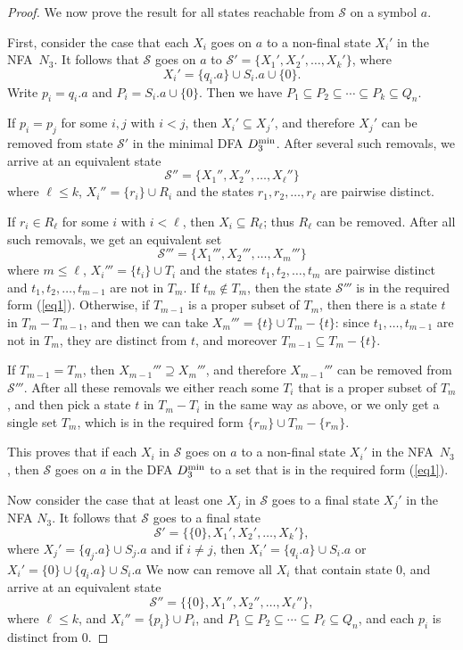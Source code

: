 \documentclass[runningheads]{llncs}
\begin{document}
\begin{proof}
\bigskip
 We now prove the result for all states reachable from $\mathcal{S}$
 on a symbol $a$.

 First, consider the case that each $X_i$ goes on $a$
 to a non-final state $X_i'$ in the NFA~$N_3$.
 It follows that $\mathcal{S}$ goes on $a$
 to $\mathcal{S'}=\{X_1',X_2',\ldots,X_k'\}$,
 where
 $$
    X_i'= \{q_i.a\} \cup S_i.a \cup \{0\}.
 $$
 Write $p_i=q_i.a$ and $P_i=S_i.a\cup\{0\}$.
 Then we have $P_1\subseteq P_2\subseteq \cdots  \subseteq P_k\subseteq Q_n$.

 If $p_i=p_j$ for some $i,j$ with $i<j$,
 then $X_i'\subseteq X_j'$,
 and therefore $X_j'$ can be removed from state $\mathcal{S'}$ 
 in the minimal DFA $D_3^{\rm min}$.
 After  several such removals, we arrive at an equivalent state
 $$
   \mathcal{S''} = \{ X_1'',X_2'',\ldots,X_\ell''\}
 $$
 where $\ell\le k$,
 $X_i''=\{r_i\}\cup R_i$
 and the states $r_1,r_2,\ldots,r_\ell$
 are pairwise distinct.

 If $r_i\in R_\ell$ for some $i$ with $i<\ell$,
 then $X_i\subseteq R_\ell$; thus $R_\ell$ can be removed.
 After all such removals, we get an equivalent set
 $$
    \mathcal{S'''} = \{ X_1''',X_2''',\ldots,X_m'''\}
 $$ 
 where $m\le \ell$,
 $X_i'''=\{t_i\}\cup T_i$
 and the states $t_1,t_2,\ldots,t_m$
 are pairwise distinct and $t_1,t_2,\ldots,t_{m-1}$ are not in $T_m$.
 If $t_m\notin T_m$, then the state $\mathcal{S'''}$  
 is in the required form (\ref{eq1}).
 Otherwise, if $T_{m-1}$ is a proper subset of $T_m$,
 then there is a state $t$ in $T_m-T_{m-1}$,
 and then we can take $X_m'''=\{t\}\cup T_m-\{t\}$:
 since $t_1,\ldots,t_{m-1} $ are not in $T_m$,
 they are distinct from $t$,
 and moreover $T_{m-1}\subseteq T_m-\{t\}$.

 If $T_{m-1}=T_m$, then $X_{m-1}'''\supseteq X_m'''$,
 and therefore $X_{m-1}'''$ can be removed from $\mathcal{S'''}$.
 After all these removals we
 either reach some $T_i$ that is a proper subset of $T_m$,
 and then pick a state $t$ in $T_m-T_i$ in the same way as above,
 or we only get a single set $T_m$,
 which is in the required form $\{r_m\}\cup T_m-\{r_m\}$.

 This proves that if  each $X_i$ in $\mathcal{S}$ goes on $a$
 to a non-final state $X_i'$ in the NFA~$N_3$,
 then $\mathcal{S}$ goes on $a$ in the DFA $D_3^{\rm min}$ 
 to a set that is in the required form (\ref{eq1}).

 \bigskip
 Now consider the case that 
 at least one  $X_j$ in $\mathcal{S}$
 goes to a final state $X_j'$ in the NFA $N_3.$
 It follows that 
 $\mathcal{S}$ goes to a final state
 $$
   \mathcal{S'}=\{ \{0\}, X_1',X_2',\ldots,X_k'\},
 $$
 where $X_j'=\{q_j.a\}\cup S_j.a$ and if $i\neq j$,
 then $X_i'=\{q_i.a\}\cup S_i.a$ or $X_i'=\{0\}\cup\{q_i.a\}\cup S_i.a$
 We now can remove all $X_i$ that contain state $0$,
 and arrive at an equivalent state 
 $$
   \mathcal{S''}=\{ \{0\}, X_1'',X_2'',\ldots,X_\ell''\},
 $$
 where $\ell\le k$, and
 $X_i''= \{p_i\}\cup P_i$, and
 $P_1\subseteq P_2 \subseteq \cdots \subseteq P_\ell \subseteq Q_n $,
 and each $p_i$ is distinct from $0$.


\end{proof}
\end{document}
